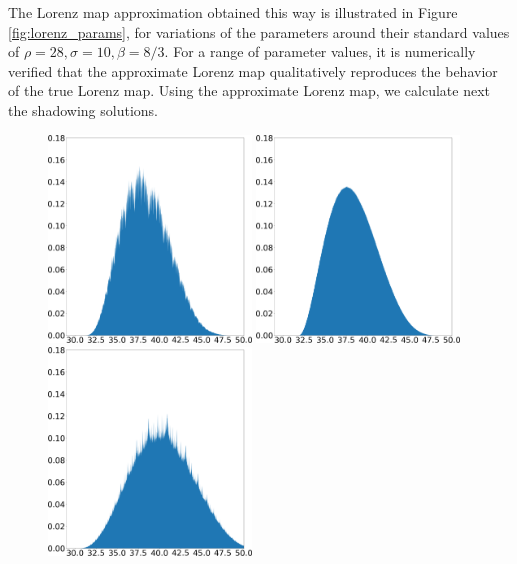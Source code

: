 The Lorenz map approximation obtained this way is illustrated in Figure \ref{fig:lorenz_params}, for variations of the parameters around their standard values of 
$\rho = 28, \sigma = 10, \beta = 8/3.$ For a range of parameter values, it is numerically verified that the approximate Lorenz map qualitatively reproduces the behavior of the true Lorenz map. Using the approximate Lorenz map, we calculate next the shadowing solutions. 
\begin{figure}
    \centering
    \includegraphics[width=0.48\textwidth]{figure/lorenz_shadow_density_lorenz_zmax_15_28_2.67.json.png}
    \hspace{0.005\textwidth}
    \includegraphics[width=0.48\textwidth]{figure/baseline_density_lorenz_zmax_15_28_2.67.json.png}
    \\
    \includegraphics[width=0.48\textwidth]{figure/lorenz_shadow_density_lorenz_zmax_10_30_2.67.json.png}

\end{figure}
